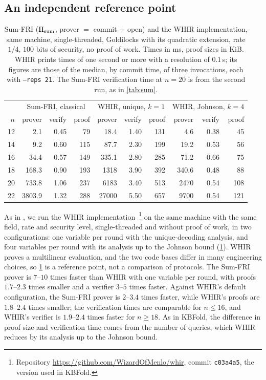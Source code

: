 \subsection{An independent reference point}\label{sec:exp:whir}

\begin{table}[t]
\centering
\small
\begin{tabular}{r rrr rrr rrr}
\toprule
 & \multicolumn{3}{c}{Sum-FRI, classical} & \multicolumn{3}{c}{WHIR, unique, $k = 1$} & \multicolumn{3}{c}{WHIR, Johnson, $k = 4$} \\
$n$ & prover & verify & proof & prover & verify & proof & prover & verify & proof \\
\midrule
12 & 2.1 & 0.45 & 79 & 18.4 & 1.40 & 131 & 4.6 & 0.38 & 45 \\
14 & 9.2 & 0.60 & 115 & 87.7 & 2.30 & 199 & 19.2 & 0.53 & 56 \\
16 & 34.4 & 0.57 & 149 & 335.1 & 2.80 & 285 & 71.2 & 0.66 & 75 \\
18 & 168.3 & 0.90 & 193 & 1318 & 3.90 & 392 & 340.6 & 0.48 & 88 \\
20 & 733.8 & 1.06 & 237 & 6183 & 3.40 & 513 & 2470 & 0.54 & 108 \\
22 & 3803.9 & 1.32 & 288 & 27000 & 5.50 & 657 & 9700 & 0.54 & 121 \\
\bottomrule
\end{tabular}
\caption{Sum-FRI ($\Pi_{\mathrm{sum}}$, prover $=$ commit $+$ open) and the WHIR implementation, same machine, single-threaded, Goldilocks with its quadratic extension, rate $1/4$, $100$ bits of security, no proof of work. Times in ms, proof sizes in KiB. WHIR prints times of one second or more with a resolution of $0.1$\,s; its figures are those of the median, by commit time, of three invocations, each with \texttt{--reps 21}. The Sum-FRI verification time at $n = 20$ is from the second run, as in \cref{tab:sum}.}
\label{tab:whir}
\end{table}

As in , we run the WHIR implementation~\cite{ACFY24}\footnote{Repository \url{https://github.com/WizardOfMenlo/whir}, commit \texttt{c03a4a5}, the version used in KBFold.} on the same machine with the same field, rate and security level, single-threaded and without proof of work, in two configurations: one variable per round with the unique-decoding analysis, and four variables per round with its analysis up to the Johnson bound (\cref{tab:whir}).
WHIR proves a multilinear evaluation, and the two code bases differ in many engineering choices, so \cref{tab:whir} is a reference point, not a comparison of protocols.
The Sum-FRI prover is $7$--$10$ times faster than WHIR with one variable per round, with proofs $1.7$--$2.3$ times smaller and a verifier $3$--$5$ times faster.
Against WHIR's default configuration, the Sum-FRI prover is $2$--$3.4$ times faster, while WHIR's proofs are $1.8$--$2.4$ times smaller; the verification times are comparable for $n \le 16$, and WHIR's verifier is $1.9$--$2.4$ times faster for $n \ge 18$. As in KBFold, the difference in proof size and verification time comes from the number of queries, which WHIR reduces by its analysis up to the Johnson bound.
